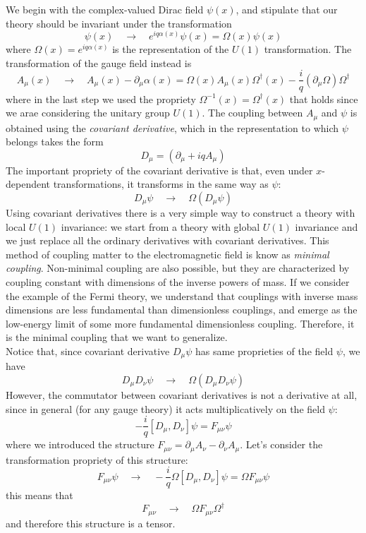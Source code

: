 \documentclass[TheoreticalPhy_ModB.tex]{subfiles}
\begin{document}
We begin with the complex-valued Dirac field $\psi(x)$, and stipulate that our theory should be invariant under the transformation
\[\psi(x)\quad\to\quad e^{iq\alpha(x)}\psi(x)=\Omega(x)\psi(x)\]
where $\Omega(x)=e^{iq\alpha(x)}$ is the representation of the $U(1)$ transformation. The transformation of the gauge field instead is 
\[A_\mu(x)\quad\to\quad A_\mu(x)-\partial_\mu\alpha(x)=\Omega(x)A_\mu(x)\Omega^\dagger(x)-\frac iq(\partial_\mu\Omega)\Omega^\dagger\]
where in the last step we used the propriety $\Omega^{-1}(x)=\Omega^\dagger(x)$ that holds since we arae considering the unitary group $U(1)$. 
The coupling between $A_\mu$ and $\psi$ is obtained using the \emph{covariant derivative}, which in the representation to which $\psi$ belongs takes the form
\[D_\mu=(\partial_\mu+iqA_\mu)\]
The important propriety of the covariant derivative is that, even under $x$-dependent transformations, it transforms in the same way as $\psi$:
\[D_\mu\psi\quad\to\quad \Omega(D_\mu\psi)\]
Using covariant derivatives there is a very simple way to construct a theory with local $U(1)$ invariance: we start from a theory with global $U(1)$ invariance and we just replace all the ordinary derivatives with covariant derivatives. This method of coupling matter to the electromagnetic field is know as \emph{minimal coupling}. Non-minimal coupling are also possible, but they are characterized by coupling constant with dimensions of the inverse powers of mass. If we consider the example of the Fermi theory, we understand that couplings with inverse mass dimensions are less fundamental than dimensionless couplings, and emerge as the low-energy limit of some more fundamental dimensionless coupling. Therefore, it is the minimal coupling that we want to generalize. \\
Notice that, since covariant derivative $D_\mu\psi$ has same proprieties of the field $\psi$, we have
\[D_\mu D_\nu\psi\quad\to\quad \Omega(D_\mu D_\nu\psi)\]
However, the commutator between covariant derivatives is not a derivative at all, since in general (for any gauge theory) it acts multiplicatively on the field $\psi$:
\begin{equation}\label{eqn:prop-F-covdev-rel}
-\frac iq[D_\mu,D_\nu]\psi=F_{\mu\nu}\psi
\end{equation}
where we introduced the structure $F_{\mu\nu}=\partial_\mu A_\nu-\partial_\nu A_\mu$. Let's consider the transformation propriety of this structure:
\[F_{\mu\nu}\psi\quad\to\quad -\frac iq\Omega[D_\mu,D_\nu]\psi=\Omega F_{\mu\nu}\psi\]
this means that 
\begin{equation}\label{eqn:F-tensor-transform}
F_{\mu\nu}\quad\to\quad\Omega F_{\mu\nu}\Omega^\dagger
\end{equation}
and therefore this structure is a tensor. 
\end{document}
